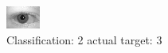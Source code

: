 \begin{figure}[h!]
\begin{center}
\includegraphics[width=0.60\columnwidth]{figures/ID677_class_2_target_3.png}
\end{center}
\caption{ Classification: 2 actual target: 3}
\label{fig:ID677_class_2_target_3}
\end{figure}
